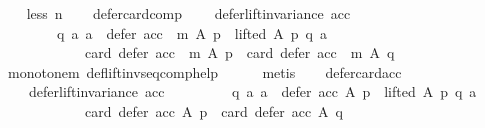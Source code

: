 \begin{isabellebody}
\ \ \isamarkupfalse%
\ {\isacharparenleft}{\kern0pt}less\ n{\isacharparenright}{\kern0pt}\isanewline
\ \ \isamarkupfalse%
\ defer{\isacharunderscore}{\kern0pt}card{\isacharunderscore}{\kern0pt}comp{\isacharcolon}{\kern0pt}\isanewline
\ \ \ \ {\isachardoublequoteopen}defer{\isacharunderscore}{\kern0pt}lift{\isacharunderscore}{\kern0pt}invariance\ acc\ {\isasymlongrightarrow}\isanewline
\ \ \ \ \ \ \ \ {\isacharparenleft}{\kern0pt}{\isasymforall}q\ a{\isachardot}{\kern0pt}\ {\isacharparenleft}{\kern0pt}a\ {\isasymin}\ {\isacharparenleft}{\kern0pt}defer\ {\isacharparenleft}{\kern0pt}acc\ {\isasymtriangleright}\ m{\isacharparenright}{\kern0pt}\ A\ p{\isacharparenright}{\kern0pt}\ {\isasymand}\ lifted\ A\ p\ q\ a{\isacharparenright}{\kern0pt}\ {\isasymlongrightarrow}\isanewline
\ \ \ \ \ \ \ \ \ \ \ \ card\ {\isacharparenleft}{\kern0pt}defer\ {\isacharparenleft}{\kern0pt}acc\ {\isasymtriangleright}\ m{\isacharparenright}{\kern0pt}\ A\ p{\isacharparenright}{\kern0pt}\ {\isacharequal}{\kern0pt}\ card\ {\isacharparenleft}{\kern0pt}defer\ {\isacharparenleft}{\kern0pt}acc\ {\isasymtriangleright}\ m{\isacharparenright}{\kern0pt}\ A\ q{\isacharparenright}{\kern0pt}{\isacharparenright}{\kern0pt}{\isachardoublequoteclose}\isanewline
\ \ \ \ \isamarkupfalse%
\ monotone{\isacharunderscore}{\kern0pt}m\ def{\isacharunderscore}{\kern0pt}lift{\isacharunderscore}{\kern0pt}inv{\isacharunderscore}{\kern0pt}seq{\isacharunderscore}{\kern0pt}comp{\isacharunderscore}{\kern0pt}help\isanewline
\ \ \ \ \isamarkupfalse%
\ metis\isanewline
\ \ \isamarkupfalse%
\ defer{\isacharunderscore}{\kern0pt}card{\isacharunderscore}{\kern0pt}acc{\isacharcolon}{\kern0pt}\isanewline
\ \ \ \ {\isachardoublequoteopen}defer{\isacharunderscore}{\kern0pt}lift{\isacharunderscore}{\kern0pt}invariance\ acc\ {\isasymlongrightarrow}\isanewline
\ \ \ \ \ \ \ \ {\isacharparenleft}{\kern0pt}{\isasymforall}q\ a{\isachardot}{\kern0pt}\ {\isacharparenleft}{\kern0pt}a\ {\isasymin}\ {\isacharparenleft}{\kern0pt}defer\ {\isacharparenleft}{\kern0pt}acc{\isacharparenright}{\kern0pt}\ A\ p{\isacharparenright}{\kern0pt}\ {\isasymand}\ lifted\ A\ p\ q\ a{\isacharparenright}{\kern0pt}\ {\isasymlongrightarrow}\isanewline
\ \ \ \ \ \ \ \ \ \ \ \ card\ {\isacharparenleft}{\kern0pt}defer\ {\isacharparenleft}{\kern0pt}acc{\isacharparenright}{\kern0pt}\ A\ p{\isacharparenright}{\kern0pt}\ {\isacharequal}{\kern0pt}\ card\ {\isacharparenleft}{\kern0pt}defer\ {\isacharparenleft}{\kern0pt}acc{\isacharparenright}{\kern0pt}\ A\ q{\isacharparenright}{\kern0pt}{\isacharparenright}{\kern0pt}{\isachardoublequoteclose}\isanewline

\end{isabellebody}
